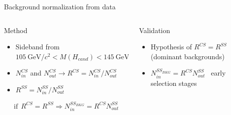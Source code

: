 \begin{frame}{Background normalization from data}
\vspace{-.2cm}

\begin{columns}
\begin{column}{.50\textwidth}
   \begin{block}{Method}\scriptsize
     \begin{itemize}
     \item Sideband from \tiny{${105~\text{GeV}/c^{2} <M(H_{cand})<145~\text{GeV}/c^{2}}$}%
     \item $N^{CS}_{in}$ and $N^{CS}_{out}\to R^{CS}=N^{CS}_{in}/N^{CS}_{out}$
     \item $R^{SS}=N^{SS}_{in}/N^{SS}_{out}$
     \end{itemize}
     \begin{equation*} 
      \text{if}\;\, R^{CS} = R^{SS}\Rightarrow N^{SS_{BKG}}_{in}=R^{CS}N^{SS}_{out}
     \end{equation*}
    \end{block}
\end{column}

\begin{column}{.50\textwidth}
\begin{block}{Validation}\scriptsize
\begin{itemize}
\item Hypothesis of $R^{CS} = R^{SS}$ (dominant backgrounds)
\item $N^{SS_{BKG}}_{in}=R^{CS}N^{SS}_{out}$ \MVAt~early selection stages
\end{itemize}
\end{block}
\end{column}

\end{columns}

\begin{center}
\end{center}

\end{frame}


